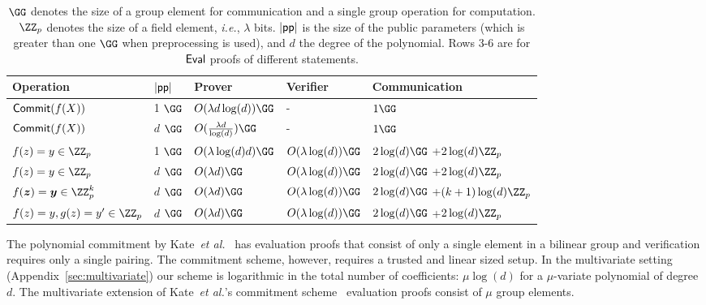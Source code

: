 \begin{table}[!htp]
\begin{small}
\begin{tabular}{l|l||l|l|l}
	Operation & $|\textsf{pp}|$  & Prover & Verifier & Communication\\
	\hline
    $\textsf{{Commit}}(f(X))$ & 1 $\GG$ & $O(\lambda d\log(d))\GG$ & - & $1 \GG$\\
    $\textsf{{Commit}}(f(X))$ & $d$ $\GG$ & $O(\frac{\lambda d}{\log(d)}) \GG$ & - & $1 \GG$\\
    $f(z)=y\in \ZZ_p$  & 1 $\GG$ & $O(\lambda  \log(d) d)\GG$ & $O(\lambda \log(d))\GG$ & $2 \log(d) \GG$ +$2 \log(d) \ZZ_p$ \\
      $f(z)=y\in \ZZ_p$  & $d$ $\GG$ & $O(\lambda d)\GG$ & $O(\lambda \log(d))\GG$ & $2 \log(d) \GG$ +$2 \log(d) \ZZ_p$ \\
       $f(\boldsymbol{z})=\boldsymbol{y}\in \ZZ^k_p$  & $d$ $\GG$ & $O(\lambda d)\GG$ & $O(\lambda \log(d))\GG$ & $2 \log(d) \GG$ +$(k+1) \log(d) \ZZ_p$ \\
                $f(z)=y, g(z)=y'\in \ZZ_p$  & $d$ $\GG$ & $O(\lambda d)\GG$ & $O(\lambda \log(d))\GG$ & $2 \log(d) \GG$ +$2 \log(d) \ZZ_p$ \\

\end{tabular}

\caption{$\GG$ denotes the size of a group element for communication and a single group operation for computation. $\ZZ_p$ denotes the size of a field element, \emph{i.e.}, $\lambda$ bits. $|\textsf{pp}|$ is the size of the public parameters (which is greater than one $\GG$ when preprocessing is used), and $d$ the degree of the polynomial. Rows 3-6 are for $\textsf{{Eval}}$ proofs of different statements.}
\label{tab:performance}
\end{small}
\end{table}

The polynomial commitment by Kate~\emph{et al.}~\cite{AC:KatZavGol10} has evaluation proofs that consist of only a single element in a bilinear group and verification requires only a single pairing. The commitment scheme, however, requires a trusted and linear sized setup. In the multivariate setting (Appendix~\ref{sec:multivariate}) our scheme is logarithmic in the total number of coefficients: $\mu\log(d)$ for a $\mu$-variate polynomial of degree $d$. The multivariate extension of Kate~\emph{et al.}'s commitment scheme~\cite{SP:ZGKPP17} evaluation proofs consist of $\mu$ group elements.

	



